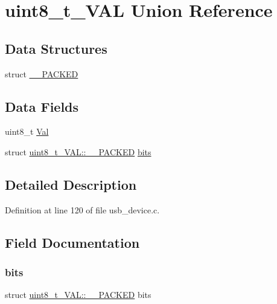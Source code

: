\hypertarget{unionuint8__t___v_a_l}{}\section{uint8\+\_\+t\+\_\+\+V\+AL Union Reference}
\label{unionuint8__t___v_a_l}
\subsection*{Data Structures}
\begin{DoxyCompactItemize}
\item 
struct \mbox{\hyperlink{structuint8__t___v_a_l_1_1_____p_a_c_k_e_d}{\+\_\+\+\_\+\+P\+A\+C\+K\+ED}}
\end{DoxyCompactItemize}
\subsection*{Data Fields}
\begin{DoxyCompactItemize}
\item 
uint8\+\_\+t \mbox{\hyperlink{unionuint8__t___v_a_l_aa0c179f4462bb12ca1ed40d18c89cda1}{Val}}
\item 
struct \mbox{\hyperlink{structuint8__t___v_a_l_1_1_____p_a_c_k_e_d}{uint8\+\_\+t\+\_\+\+V\+A\+L\+::\+\_\+\+\_\+\+P\+A\+C\+K\+ED}} \mbox{\hyperlink{unionuint8__t___v_a_l_a5459080902bc1e65e77dfa943816c0ac}{bits}}
\end{DoxyCompactItemize}


\subsection{Detailed Description}


Definition at line 120 of file usb\+\_\+device.\+c.



\subsection{Field Documentation}
\mbox{\label{unionuint8__t___v_a_l_a5459080902bc1e65e77dfa943816c0ac}} 
\subsubsection{\texorpdfstring{bits}{bits}}
{\footnotesize\ttfamily struct \mbox{\hyperlink{structuint8__t___v_a_l_1_1_____p_a_c_k_e_d}{uint8\+\_\+t\+\_\+\+V\+A\+L\+::\+\_\+\+\_\+\+P\+A\+C\+K\+ED}}  bits}


